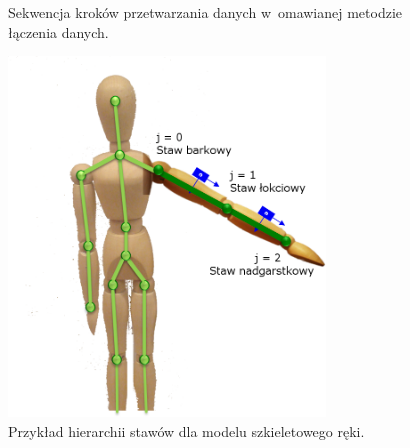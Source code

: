 \begin{savenotes}
	\begin{figure}[h]
		\begin{minipage}{.5\textwidth}
			\centering	
			
			\caption{Sekwencja kroków przetwarzania danych w~omawianej metodzie łączenia danych.}
			\label{fig:hybrid:stepsSequence}
		\end{minipage}
		\begin{minipage}{.5\textwidth}
			\centering			
			\includegraphics[width=0.75\textwidth]{images/joints.png}
			\caption{Przykład hierarchii stawów dla modelu szkieletowego ręki.}		
			\label{fig:hybrid:jointsHierarchy}
		\end{minipage}
	\end{figure}
\end{savenotes}
		
